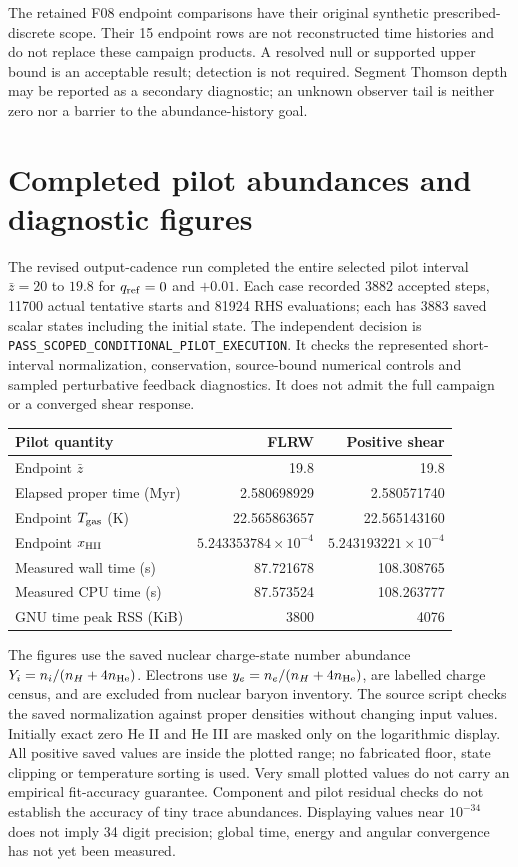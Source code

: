 \documentclass[11pt]{article}
\begin{document}
The retained F08 endpoint comparisons have their original synthetic prescribed-discrete scope. Their 15 endpoint rows are not reconstructed time histories and do not replace these campaign products. A resolved null or supported upper bound is an acceptable result; detection is not required. Segment Thomson depth may be reported as a secondary diagnostic; an unknown observer tail is neither zero nor a barrier to the abundance-history goal.



\section{Completed pilot abundances and diagnostic figures}
The revised output-cadence run completed the entire selected pilot interval $\bar z=20$ to $19.8$ for $q_{\rm ref}=0$ and $+0.01$. Each case recorded 3882 accepted steps, 11700 actual tentative starts and 81924 RHS evaluations; each has 3883 saved scalar states including the initial state. The independent decision is \texttt{PASS\_SCOPED\_CONDITIONAL\_PILOT\_EXECUTION}. It checks the represented short-interval normalization, conservation, source-bound numerical controls and sampled perturbative feedback diagnostics. It does not admit the full campaign or a converged shear response.

\begin{center}
\begin{tabular}{lrr}\toprule
Pilot quantity & FLRW & Positive shear\\\midrule
Endpoint $\bar z$ & 19.8 & 19.8\\
Elapsed proper time (Myr) & 2.580698929 & 2.580571740\\
Endpoint $T_{\rm gas}$ (K) & 22.565863657 & 22.565143160\\
Endpoint $x_{\rm HII}$ & $5.243353784\times10^{-4}$ & $5.243193221\times10^{-4}$\\
Measured wall time (s) & 87.721678 & 108.308765\\
Measured CPU time (s) & 87.573524 & 108.263777\\
GNU time peak RSS (KiB) & 3800 & 4076\\\bottomrule
\end{tabular}
\end{center}

The figures use the saved nuclear charge-state number abundance $Y_i=n_i/(n_H+4n_{\rm He})$. Electrons use $y_e=n_e/(n_H+4n_{\rm He})$, are labelled charge census, and are excluded from nuclear baryon inventory. The source script checks the saved normalization against proper densities without changing input values. Initially exact zero He II and He III are masked only on the logarithmic display. All positive saved values are inside the plotted range; no fabricated floor, state clipping or temperature sorting is used. Very small plotted values do not carry an empirical fit-accuracy guarantee. Component and pilot residual checks do not establish the accuracy of tiny trace abundances. Displaying values near $10^{-34}$ does not imply 34 digit precision; global time, energy and angular convergence has not yet been measured.
\end{document}
